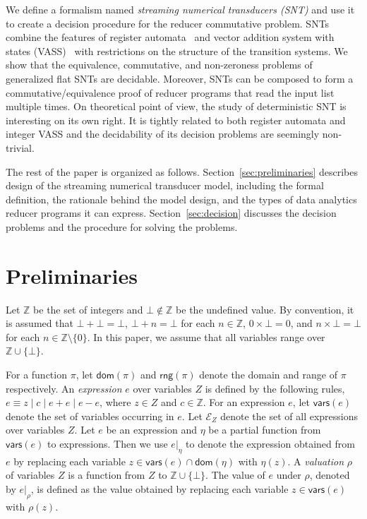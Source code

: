 \documentclass[runningheads,a4paper]{llncs}
\def\Ee{{\mathcal{E} }}
\newcommand\intnum{{\mathbb{Z} }}
\newcommand\vars{\mathsf{vars}}
\newcommand\dom{\mathsf{dom}}
\newcommand\rng{\mathsf{rng}}
\newcommand{\sub}[2]{#1|_{#2}}
\begin{document}
We define a formalism named \emph{streaming numerical transducers (SNT)} and use it to create a decision procedure for the reducer commutative problem.
SNTs combine the features of register automata~\cite{XX} and vector addition system with states (VASS)~\cite{YY} with restrictions on the structure of the transition systems.
We show that the equivalence, commutative, and non-zeroness problems of generalized flat SNTs are decidable.
Moreover, SNTs can be composed to form a commutative/equivalence proof of reducer programs that read the input list multiple times.
On theoretical point of view, the study of deterministic SNT is
interesting on its own right. It is tightly related to both register automata and integer VASS and the decidability of its decision problems are seemingly non-trivial. 

The rest of the paper is organized as follows. Section~\ref{sec:preliminaries} describes design of the streaming numerical transducer model, including the formal definition, the rationale behind the model design, and the types of data analytics reducer programs it can express. Section~\ref{sec:decision} discusses the decision problems and the procedure for solving the problems.

\section{Preliminaries}
%
Let $\intnum$ be the set of integers and $\bot \not \in \intnum$ be 
the undefined value. By convention, it is assumed that $\bot + \bot = \bot$, $\bot + n = \bot$ for each $n \in \intnum$, $0 \times \bot = 0$, and $n \times \bot = \bot$ for each $n \in \intnum \setminus \{0\}$.
In this paper, we assume that all variables range over $\intnum \cup \{\bot\}$.  

For a function $\pi$, let $\dom(\pi)$ and $\rng(\pi)$ denote the domain  and range of $\pi$ respectively. 
An \emph{expression} $e$ over variables $Z$ is defined by the following rules, $e\equiv  z \mid c \mid e + e \mid e - e$, where $z \in Z$ and $c\in \intnum$. 
For an expression $e$, let $\vars(e)$ denote the set of variables occurring in $e$. Let $\Ee_Z$ denote the set of all expressions over variables $Z$. Let $e$ be an expression and $\eta$ be a partial function from $\vars(e)$ to expressions. Then we use $\sub{e}{\eta}$ to denote the expression obtained from $e$ by replacing each variable $z \in \vars(e)\cap\dom(\eta)$ with $\eta(z)$. A \emph{valuation} $\rho$ of variables $Z$ is a function from $Z$ to $\intnum \cup \{\bot\}$. The value of $e$ under $\rho$, denoted by $\sub{e}{\rho}$, is defined as the value obtained by replacing each variable $z \in \vars(e)$ with $\rho(z)$.
\end{document}
